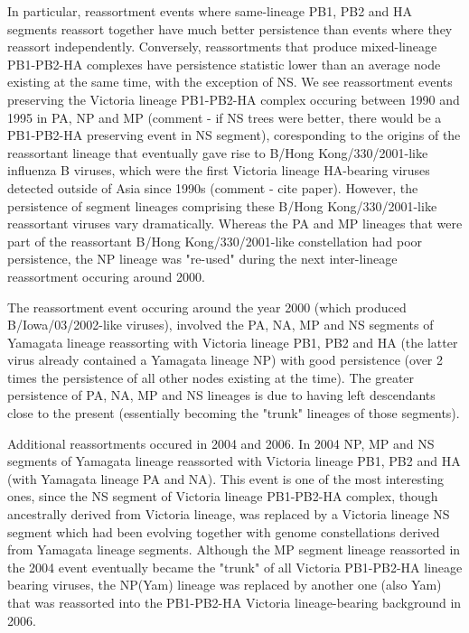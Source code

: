 \documentclass[11pt,oneside,letterpaper]{article}
\begin{document}
In particular, reassortment events where same-lineage PB1, PB2 and HA segments reassort together have much better persistence than events where they reassort independently.
Conversely, reassortments that produce mixed-lineage PB1-PB2-HA complexes have persistence statistic lower than an average node existing at the same time, with the exception of NS.
We see reassortment events preserving the Victoria lineage PB1-PB2-HA complex occuring between 1990 and 1995 in PA, NP and MP (comment - if NS trees were better, there would be a PB1-PB2-HA preserving event in NS segment), coresponding to the origins of the reassortant lineage that eventually gave rise to B/Hong Kong/330/2001-like influenza B viruses, which were the first Victoria lineage HA-bearing viruses detected outside of Asia since 1990s (comment - cite paper).
However, the persistence of segment lineages comprising these B/Hong Kong/330/2001-like reassortant viruses vary dramatically.
Whereas the PA and MP lineages that were part of the reassortant B/Hong Kong/330/2001-like constellation had poor persistence, the NP lineage was "re-used" during the next inter-lineage reassortment occuring around 2000.

The reassortment event occuring around the year 2000 (which produced B/Iowa/03/2002-like viruses), involved the PA, NA, MP and NS segments of Yamagata lineage reassorting with Victoria lineage PB1, PB2 and HA (the latter virus already contained a Yamagata lineage NP) with good persistence (over 2 times the persistence of all other nodes existing at the time).
The greater persistence of PA, NA, MP and NS lineages is due to having left descendants close to the present (essentially becoming the "trunk" lineages of those segments).

Additional reassortments occured in 2004 and 2006.
In 2004 NP, MP and NS segments of Yamagata lineage reassorted with Victoria lineage PB1, PB2 and HA (with Yamagata lineage PA and NA).
This event is one of the most interesting ones, since the NS segment of Victoria lineage PB1-PB2-HA complex, though ancestrally derived from Victoria lineage, was replaced by a Victoria lineage NS segment which had been evolving together with genome constellations derived from Yamagata lineage segments.
Although the MP segment lineage reassorted in the 2004 event eventually became the "trunk" of all Victoria PB1-PB2-HA lineage bearing viruses, the NP(Yam) lineage was replaced by another one (also Yam) that was reassorted into the PB1-PB2-HA Victoria lineage-bearing background in 2006.
\end{document}
